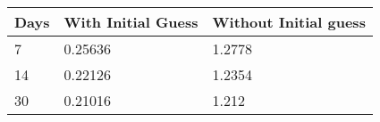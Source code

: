 \begin{tabular}{lll}
Days & With Initial Guess & Without Initial guess \\ 
\hline 
7 & 0.25636 & 1.2778 \\ 
14 & 0.22126 & 1.2354 \\ 
30 & 0.21016 & 1.212 \\ 
\hline 
\end{tabular}
